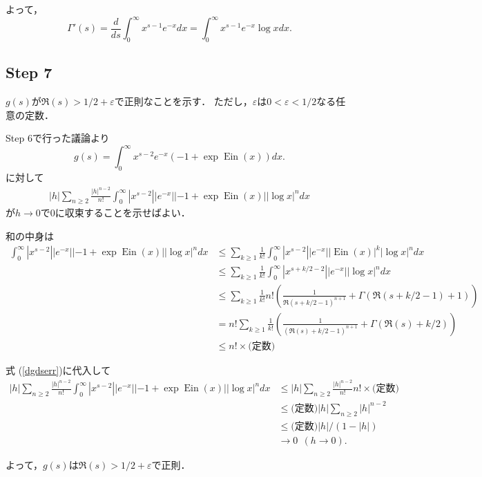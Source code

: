 \documentclass{jsarticle}
\newcommand{\Ein}{\operatorname{Ein}}
\newcommand{\todo}[1][]{%
	\ifthenelse{\equal{#1}{}}{%
		\textcolor{red}{[TODO]}%
	}{%
		\textcolor{red}{[TODO: #1]}%
	}%
}
\theoremstyle{definition}
\begin{document}
よって，
\[
\Gamma'(s) = \frac{d}{ds} \int_0^\infty x^{s-1} e^{-x} dx = \int_0^\infty x^{s-1} e^{-x} \log x dx.
\]


\subsection*{Step 7}
$g(s)$が$\Re(s) > 1/2+\varepsilon$で正則なことを示す．
ただし，$\varepsilon$は$0 < \varepsilon < 1/2$なる任意の定数．

Step 6で行った議論より
\[ g(s) = \int_0^\infty x^{s-2} e^{-x} (-1 + \exp \Ein(x)) dx. \]
に対して
\begin{align}
|h| \sum_{n\ge 2} \frac{|h|^{n-2}}{n!} \int_{0}^\infty |x^{s-2}| |e^{-x}| |-1 + \exp \Ein(x)| |\log x|^n dx \label{dgdserr}
\end{align}
が$h \to 0$で$0$に収束することを示せばよい．

和の中身は
\begin{align*}
\int_{0}^\infty |x^{s-2}| |e^{-x}| |-1 + \exp \Ein(x)| |\log x|^n dx
&\le \sum_{k\ge 1} \frac{1}{k!} \int_{0}^\infty |x^{s-2}| |e^{-x}| |\Ein(x)|^k |\log x|^n dx \\
&\le \sum_{k\ge 1} \frac{1}{k!} \int_{0}^\infty |x^{s+k/2-2}| |e^{-x}| |\log x|^n dx \\
&\le \sum_{k\ge 1} \frac{1}{k!} n!\left(\frac{1}{\Re(s+k/2-1)^{n+1}} + \Gamma(\Re(s+k/2-1)+1)\right) \\
&= n! \sum_{k\ge 1} \frac{1}{k!} \left(\frac{1}{(\Re(s)+k/2-1)^{n+1}} + \Gamma(\Re(s)+k/2)\right) \\
&\le n! \times \text{(定数)}
\end{align*}
\todo[定数をもっと詳しく書く]

式 (\ref{dgdserr})に代入して
\begin{align*}
|h| \sum_{n\ge 2} \frac{|h|^{n-2}}{n!} \int_{0}^\infty |x^{s-2}| |e^{-x}| |-1 + \exp \Ein(x)| |\log x|^n dx
&\le |h| \sum_{n\ge 2} \frac{|h|^{n-2}}{n!} n! \times \text{(定数)} \\
&\le \text{(定数)} |h| \sum_{n\ge 2} |h|^{n-2} \\
&\le \text{(定数)} |h|/(1-|h|) \\
&\to 0\ \ (h \to 0).
\end{align*}

よって，$g(s)$は$\Re(s) > 1/2 + \varepsilon$で正則．
\end{document}

